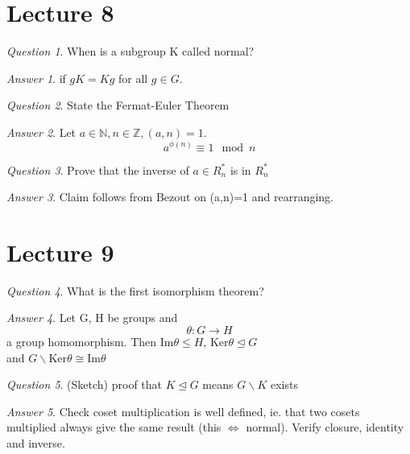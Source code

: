 \documentclass[]{article}
\theoremstyle{remark}
\theoremstyle{qnstyle}
\newtheorem{question}{Question}
\theoremstyle{answerstyle}
\newtheorem*{answer}{Answer}
\begin{document}
\section* {Lecture 8}


\begin{question}
    When is a subgroup K called normal?
\end{question}
\begin{answer}
    if $gK = Kg$ for all $g \in G$.
\end{answer}


\begin{question}
    State the Fermat-Euler Theorem
\end{question}
\begin{answer}
    Let $a \in \mathbb{N}, n \in \mathbb{Z}, (a,n) = 1.$
    $$a^{\phi(n)}  \equiv 1 \mod n$$
\end{answer}


\begin{question}
    Prove that the inverse of $a \in R^*_n$ is in $R^*_n$
\end{question}
\begin{answer}
    Claim follows from Bezout on (a,n)=1 and rearranging.
\end{answer}






\section* {Lecture 9}

\begin{question}
    What is the first isomorphism theorem?
\end{question}
\begin{answer}
    Let G, H be groups and $$\theta: G \to H$$ a group homomorphism.
    Then $\text{Im} \theta \leq H$, $\text{Ker} \theta \trianglelefteq G$ \\
    and $G \backslash \text{Ker} \theta \cong \text{Im} \theta$
\end{answer}

\begin{question}
    (Sketch) proof that $K \trianglelefteq G$ means $G \backslash K$ exists
\end{question}
\begin{answer}
    Check coset multiplication is well defined, ie. that two cosets multiplied always give
    the same result (this $\iff$ normal). Verify closure, identity and inverse.
\end{answer}
\end{document}
